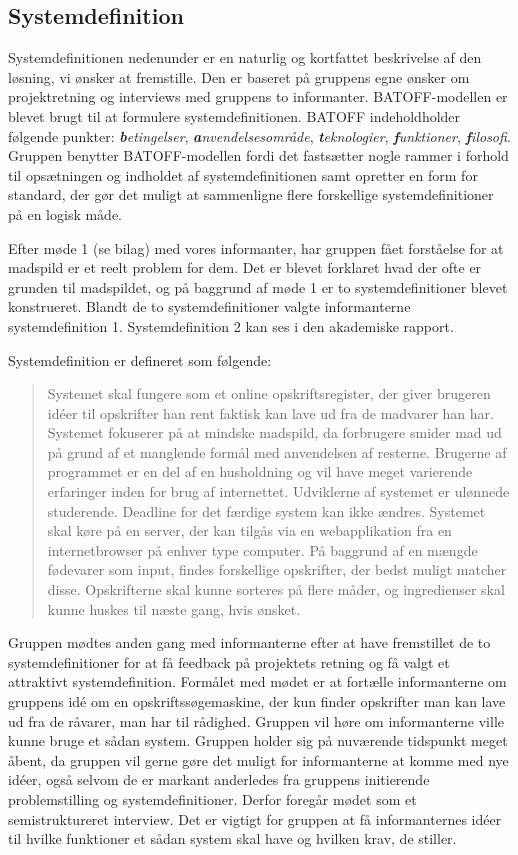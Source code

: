 \subsection{Systemdefinition}

Systemdefinitionen nedenunder er en naturlig og kortfattet beskrivelse af den løsning, vi ønsker at fremstille. Den er baseret på gruppens egne ønsker om projektretning og interviews med gruppens to informanter. BATOFF-modellen er blevet brugt til at formulere systemdefinitionen. BATOFF indeholdholder følgende punkter: \emph{\textbf{b}etingelser}, \emph{\textbf{a}nvendelsesområde}, \emph{\textbf{t}eknologier}, \emph{\textbf{f}unktioner}, \emph{\textbf{f}ilosofi}. Gruppen benytter BATOFF-modellen fordi det fastsætter nogle rammer i forhold til opsætningen og indholdet af systemdefinitionen samt opretter en form for standard, der gør det muligt at sammenligne flere forskellige systemdefinitioner på en logisk måde.

Efter møde 1 (se bilag) med vores informanter, har gruppen fået forståelse for at madspild er et reelt problem for dem. Det er blevet forklaret hvad der ofte er grunden til madspildet, og på baggrund af møde 1 er to systemdefinitioner blevet konstrueret. Blandt de to systemdefinitioner valgte informanterne systemdefinition 1. Systemdefinition 2 kan ses i den akademiske rapport.

Systemdefinition er defineret som følgende:

\begin{quote}
Systemet skal fungere som et online opskriftsregister, der giver brugeren idéer til opskrifter han rent faktisk kan lave ud fra de madvarer han har. Systemet fokuserer på at mindske madspild, da forbrugere smider mad ud på grund af et manglende formål med anvendelsen af resterne. Brugerne af programmet er en del af en husholdning og vil have meget varierende erfaringer inden for brug af internettet. Udviklerne af systemet er ulønnede studerende. Deadline for det færdige system kan ikke ændres. Systemet skal køre på en server, der kan tilgås via en webapplikation fra en internetbrowser på enhver type computer. På baggrund af en mængde fødevarer som input, findes forskellige opskrifter, der bedst muligt matcher disse. Opskrifterne skal kunne sorteres på flere måder, og ingredienser skal kunne huskes til næste gang, hvis ønsket.
\end{quote}

Gruppen mødtes anden gang med informanterne efter at have fremstillet de to systemdefinitioner for at få feedback på projektets retning og få valgt et attraktivt systemdefinition. Formålet med mødet er at fortælle informanterne om gruppens idé om en opskriftssøgemaskine, der kun finder opskrifter man kan lave ud fra de råvarer, man har til rådighed. Gruppen vil høre om informanterne ville kunne bruge et sådan system. Gruppen holder sig på nuværende tidspunkt meget åbent, da gruppen vil gerne gøre det muligt for informanterne at komme med nye idéer, også selvom de er markant anderledes fra gruppens initierende problemstilling og systemdefinitioner. Derfor foregår mødet som et semistruktureret interview. Det er vigtigt for gruppen at få informanternes idéer til hvilke funktioner et sådan system skal have og hvilken krav, de stiller.

